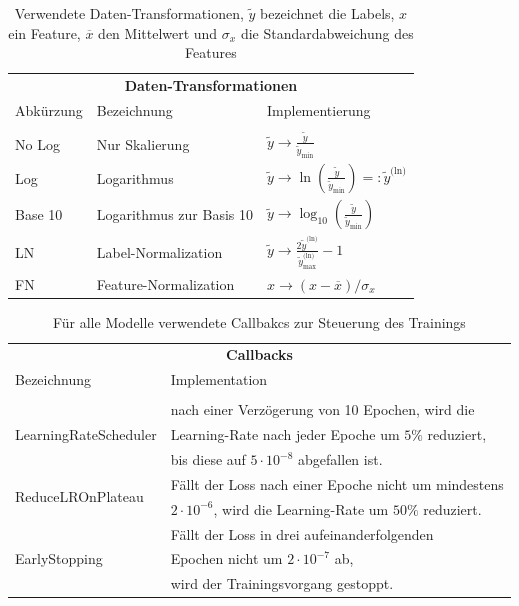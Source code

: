 \begin{table}
	\centering
	\begin{tabular}{lll}
		\multicolumn{3}{c}{\textbf{Daten-Transformationen}} \\[5pt]
		Abkürzung & Bezeichnung & Implementierung \\
		\hline\\[-10pt]
		No Log & Nur Skalierung & $\tilde{y} \rightarrow \frac{\tilde{y}}{\tilde{y}_{\text{min}}}$ \\
		Log & Logarithmus & $\tilde{y} \rightarrow \ln(\frac{\tilde{y}}{\tilde{y}_{\text{min}}}) =: \tilde{y}^{\text{(ln)}}$ \\
		Base 10 & Logarithmus zur Basis 10 & $\tilde{y} \rightarrow \log_{10}(\frac{\tilde{y}}{\tilde{y}_{\text{min}}})$ \\
		LN & Label-Normalization & $\tilde{y} \rightarrow \frac{2\tilde{y}^{\text{(ln)}}}{\tilde{y}^{\text{(ln)}}_{\text{max}}} - 1$\\
		FN \cite{FN} & Feature-Normalization & $x \rightarrow {(x - \overline{x})}/{\sigma_x}$
	\end{tabular}
	\caption{Verwendete Daten-Transformationen, $\tilde{y}$ bezeichnet die Labels, $x$ ein Feature, $\overline{x}$ den Mittelwert und $\sigma_x$ die Standardabweichung des Features}
	\label{mathe-daten-transformationen}
\end{table}
\begin{table}
	\centering
	\begin{tabular}{ll}
		\multicolumn{2}{c}{\textbf{Callbacks}} \\[5pt]
		Bezeichnung & Implementation\\
		\hline\\[-10pt]
		\multirow{3}{*}{LearningRateScheduler} & nach einer Verzögerung von 10 Epochen, wird die \\
		& Learning-Rate nach jeder Epoche um $5\%$ reduziert, \\
		& bis diese auf $5 \cdot 10^{-8}$ abgefallen ist. \\[5pt]
		\multirow{2}{*}{ReduceLROnPlateau}& Fällt der Loss nach einer Epoche nicht um mindestens\\
		& $2 \cdot 10^{-6}$, wird die Learning-Rate um $50\%$ reduziert.\\[5pt]
		\multirow{3}{*}{EarlyStopping}& Fällt der Loss in drei aufeinanderfolgenden \\
		& Epochen nicht um $2 \cdot 10^{-7}$ ab, \\
		& wird der Trainingsvorgang gestoppt.\\[5pt]
	\end{tabular}
	\caption{Für alle Modelle verwendete Callbakcs zur Steuerung des Trainings}
	\label{Callbacks}
\end{table}
